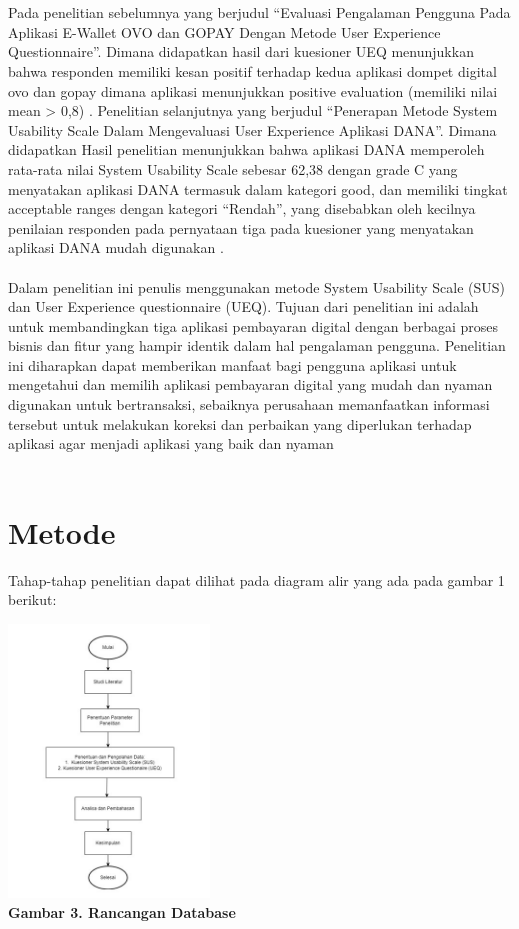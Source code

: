 \documentclass[
 manuscript=article,  %
  layout=publish, 
  year=2024, 
  month= Februari, %
  volume=8,
  number=1 
]{JIKO}
\begin{document}
\\ \\
Pada penelitian sebelumnya yang berjudul “Evaluasi Pengalaman Pengguna Pada Aplikasi E-Wallet OVO dan GOPAY Dengan Metode User Experience Questionnaire”. Dimana didapatkan hasil dari kuesioner UEQ menunjukkan bahwa responden memiliki kesan positif terhadap kedua aplikasi dompet digital ovo dan gopay dimana aplikasi menunjukkan positive evaluation (memiliki nilai mean > 0,8) \cite{2}. Penelitian selanjutnya yang berjudul “Penerapan Metode System Usability Scale Dalam Mengevaluasi User Experience Aplikasi DANA”. Dimana didapatkan Hasil penelitian menunjukkan bahwa aplikasi DANA memperoleh rata-rata nilai System Usability Scale sebesar 62,38 dengan grade C yang menyatakan aplikasi DANA termasuk dalam kategori good, dan memiliki tingkat acceptable ranges dengan kategori “Rendah”, yang disebabkan oleh kecilnya penilaian responden pada pernyataan tiga pada kuesioner yang menyatakan aplikasi DANA mudah digunakan \cite{10}.
\\ \\
Dalam penelitian ini penulis menggunakan metode System Usability Scale (SUS) dan User Experience questionnaire (UEQ). Tujuan dari penelitian ini adalah untuk membandingkan tiga aplikasi pembayaran digital dengan berbagai proses bisnis dan fitur yang hampir identik dalam hal pengalaman pengguna. Penelitian ini diharapkan dapat memberikan manfaat bagi pengguna aplikasi untuk mengetahui dan memilih aplikasi pembayaran digital yang mudah dan nyaman digunakan untuk bertransaksi, sebaiknya perusahaan memanfaatkan informasi tersebut untuk melakukan koreksi dan perbaikan yang diperlukan terhadap aplikasi agar menjadi aplikasi yang baik dan nyaman 
\\ \\

\section{Metode}
Tahap-tahap penelitian dapat dilihat pada diagram alir yang ada pada gambar 1 berikut:

\begin{center}
    \includegraphics[width=0.4\textwidth]{assets/gambar1.jpg}
    \\\textbf{Gambar 3. Rancangan Database}
\end{center}
\end{document}
